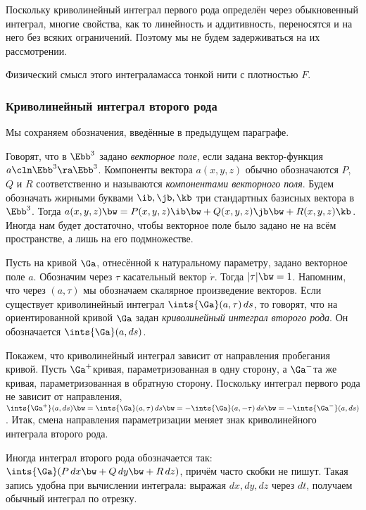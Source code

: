 \documentclass[a4paper]{article}
\begin{document}
Поскольку криволинейный интеграл первого рода определён через обыкновенный интеграл, многие
свойства, как то линейность и аддитивность, переносятся и на него без всяких ограничений. Поэтому
мы не будем задерживаться на их рассмотрении.

\begin{note}
Физический смысл этого интеграла\т масса тонкой нити с плотностью $F$.
\end{note}

\subsubsection{Криволинейный интеграл второго рода}
Мы сохраняем обозначения, введённые в предыдущем параграфе.

\begin{df}
Говорят, что в $\Ebb^3$ задано \emph{векторное поле}, если задана вектор-функция $a\cln \Ebb^3 \ra \Ebb^3$.
Компоненты вектора $a(x,y,z)$ обычно обозначаются $P$, $Q$ и $R$ соответственно и называются
\emph{компонентами векторного поля}. Будем обозначать жирными буквами $\ib, \jb, \kb$ три стандартных
базисных вектора в $\Ebb^3$. Тогда $a(x,y,z) \bw= P(x,y,z)\ib \bw+ Q(x,y,z)\jb \bw+ R(x,y,z)\kb$. Иногда нам
будет достаточно, чтобы векторное поле было задано не на всём пространстве, а лишь на его подмножестве.
\end{df}

\begin{df}
Пусть на кривой $\Ga$, отнесённой к натуральному параметру, задано векторное поле $a$. Обозначим через $\tau$
касательный вектор $\dot r$. Тогда $|\tau| \bw= 1$. Напомним, что через $(a,\tau)$ мы обозначаем скалярное
произведение векторов. Если существует криволинейный интеграл $\ints{\Ga}(a,\tau)\,ds$, то говорят, что на
ориентированной кривой $\Ga$ задан \emph{криволинейный интеграл второго рода}. Он обозначается
$\ints{\Ga}(a,ds)$.
\end{df}

Покажем, что криволинейный интеграл зависит от направления пробегания кривой. Пусть $\Ga^+$\т кривая,
параметризованная в одну сторону, а $\Ga^-$\т та же кривая, параметризованная в обратную сторону. Поскольку
интеграл первого рода не зависит от направления, $\ints{\Ga^+} (a,ds) \bw= \ints{\Ga}(a,\tau)\,ds \bw=
-\ints{\Ga}(a,-\tau)\,ds \bw= -\ints{\Ga^-}(a,ds)$. Итак, смена направления параметризации меняет знак
криволинейного интеграла второго рода.

Иногда интеграл второго рода обозначается так: $\ints{\Ga}(P\,dx \bw+ Q\,dy \bw+ R\,dz)$, причём часто
скобки не пишут. Такая запись удобна при вычислении интеграла: выражая $dx, dy, dz$ через $dt$,
получаем обычный интеграл по отрезку.
\end{document}
